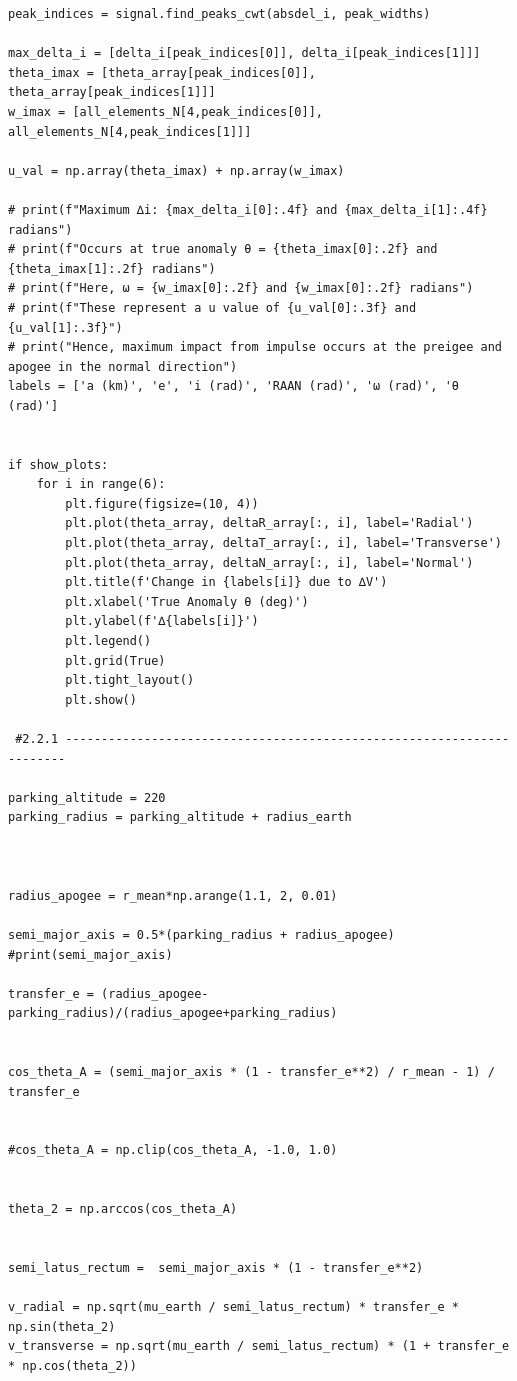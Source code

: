 \documentclass[a4paper, 12pt]{article}  %
\begin{document}
\begin{lstlisting}
peak_indices = signal.find_peaks_cwt(absdel_i, peak_widths)

max_delta_i = [delta_i[peak_indices[0]], delta_i[peak_indices[1]]]
theta_imax = [theta_array[peak_indices[0]], theta_array[peak_indices[1]]]
w_imax = [all_elements_N[4,peak_indices[0]], all_elements_N[4,peak_indices[1]]]

u_val = np.array(theta_imax) + np.array(w_imax)

# print(f"Maximum ∆i: {max_delta_i[0]:.4f} and {max_delta_i[1]:.4f} radians")
# print(f"Occurs at true anomaly θ = {theta_imax[0]:.2f} and {theta_imax[1]:.2f} radians")
# print(f"Here, ω = {w_imax[0]:.2f} and {w_imax[0]:.2f} radians")
# print(f"These represent a u value of {u_val[0]:.3f} and {u_val[1]:.3f}")
# print("Hence, maximum impact from impulse occurs at the preigee and apogee in the normal direction")
labels = ['a (km)', 'e', 'i (rad)', 'RAAN (rad)', 'ω (rad)', 'θ (rad)']


if show_plots:
    for i in range(6):
        plt.figure(figsize=(10, 4))
        plt.plot(theta_array, deltaR_array[:, i], label='Radial')
        plt.plot(theta_array, deltaT_array[:, i], label='Transverse')
        plt.plot(theta_array, deltaN_array[:, i], label='Normal')
        plt.title(f'Change in {labels[i]} due to ∆V')
        plt.xlabel('True Anomaly θ (deg)')
        plt.ylabel(f'∆{labels[i]}')
        plt.legend()
        plt.grid(True)
        plt.tight_layout()
        plt.show()
            
 #2.2.1 ----------------------------------------------------------------------
       
parking_altitude = 220
parking_radius = parking_altitude + radius_earth



radius_apogee = r_mean*np.arange(1.1, 2, 0.01)

semi_major_axis = 0.5*(parking_radius + radius_apogee)
#print(semi_major_axis)

transfer_e = (radius_apogee-parking_radius)/(radius_apogee+parking_radius)


cos_theta_A = (semi_major_axis * (1 - transfer_e**2) / r_mean - 1) / transfer_e


#cos_theta_A = np.clip(cos_theta_A, -1.0, 1.0)


theta_2 = np.arccos(cos_theta_A)


semi_latus_rectum =  semi_major_axis * (1 - transfer_e**2)

v_radial = np.sqrt(mu_earth / semi_latus_rectum) * transfer_e * np.sin(theta_2)
v_transverse = np.sqrt(mu_earth / semi_latus_rectum) * (1 + transfer_e * np.cos(theta_2))


\end{lstlisting}
\end{document}
